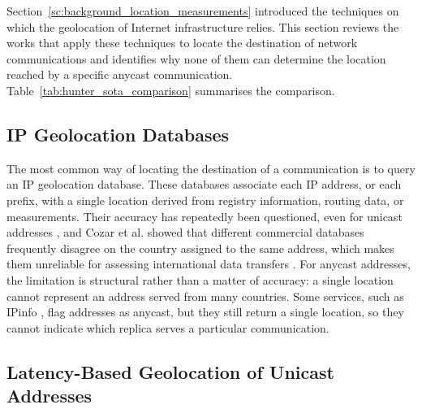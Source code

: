 \documentclass[
A4paper,                %
twoside,                %
openright,              %
chapterprefix=true,     %
12pt,                   %
headings=normal,        %
titlepage=on            %
]{book}
\begin{document}
Section~\ref{sc:background_location_measurements} introduced the techniques on which the geolocation of Internet infrastructure relies. This section reviews the works that apply these techniques to locate the destination of network communications and identifies why none of them can determine the location reached by a specific anycast communication. Table~\ref{tab:hunter_sota_comparison} summarises the comparison.

\subsection{IP Geolocation Databases}
\label{sc:hunter_sota_databases}

The most common way of locating the destination of a communication is to query an IP geolocation database. These databases associate each IP address, or each prefix, with a single location derived from registry information, routing data, or measurements. Their accuracy has repeatedly been questioned, even for unicast addresses \cite{Poese2011IPUnreliable, Ding2015AnSub-networks}, and Cozar et al. showed that different commercial databases frequently disagree on the country assigned to the same address, which makes them unreliable for assessing international data transfers \cite{Cozar2022ReliabilityTransfers}. For anycast addresses, the limitation is structural rather than a matter of accuracy: a single location cannot represent an address served from many countries. Some services, such as IPinfo \cite{IPIPinfo}, flag addresses as anycast, but they still return a single location, so they cannot indicate which replica serves a particular communication.

\subsection{Latency-Based Geolocation of Unicast Addresses}
\label{sc:hunter_sota_unicast}
\end{document}
